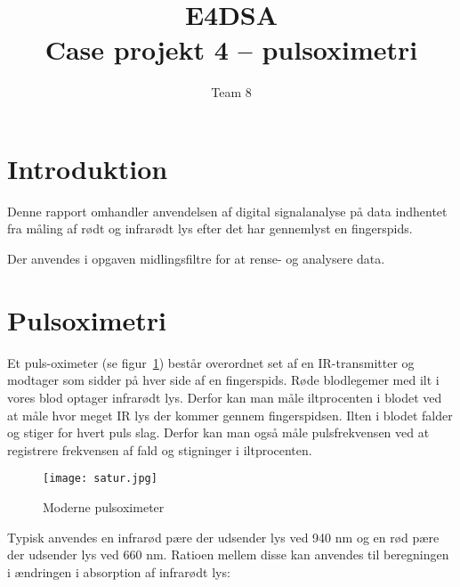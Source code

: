 \documentclass{article}
\title{E4DSA\\ Case projekt 4 – pulsoximetri}
\author{Team 8}
\begin{document}
\maketitle
\tableofcontents
\newpage

\section{Introduktion}
\label{sec:introduktion}
Denne rapport omhandler anvendelsen af digital signalanalyse på data indhentet fra måling af rødt og infrarødt lys efter det har gennemlyst en fingerspids.

Der anvendes i opgaven midlingsfiltre for at rense- og analysere data.

\section{Pulsoximetri}
\label{sec:pulsoximetri}
Et puls-oximeter (se figur~\ref{fig:satur}) består overordnet set af en IR-transmitter og modtager som sidder på hver side af en fingerspids. Røde blodlegemer med ilt i vores blod optager infrarødt lys. Derfor kan man måle iltprocenten i blodet ved at måle hvor meget IR lys der kommer gennem fingerspidsen. Ilten i blodet falder og stiger for hvert puls slag. Derfor kan man også måle pulsfrekvensen ved at registrere frekvensen af fald og stigninger i iltprocenten. 
\begin{figure}[h]
  \centering
  \texttt{[image: satur.jpg]}
  \caption{Moderne pulsoximeter}
  \label{fig:satur}
\end{figure}

Typisk anvendes en infrarød pære der udsender lys ved 940 nm og en rød pære der udsender lys ved 660 nm. Ratioen mellem disse kan anvendes til beregningen i ændringen i absorption af infrarødt lys:
\end{document}
